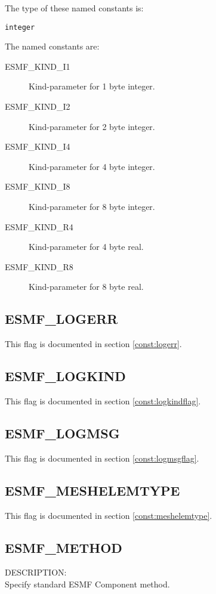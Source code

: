 The type of these named constants is:

{\tt integer}

The named constants are:
\begin{description}
\item [ESMF\_KIND\_I1]
      Kind-parameter for 1 byte integer.
\item [ESMF\_KIND\_I2]
      Kind-parameter for 2 byte integer.
\item [ESMF\_KIND\_I4]
      Kind-parameter for 4 byte integer.
\item [ESMF\_KIND\_I8]
      Kind-parameter for 8 byte integer.
\item [ESMF\_KIND\_R4]
      Kind-parameter for 4 byte real.
\item [ESMF\_KIND\_R8]
      Kind-parameter for 8 byte real.
\end{description}

\subsection{ESMF\_LOGERR}
This flag is documented in section \ref{const:logerr}.

\subsection{ESMF\_LOGKIND}
This flag is documented in section \ref{const:logkindflag}.

\subsection{ESMF\_LOGMSG}
This flag is documented in section \ref{const:logmsgflag}.

\subsection{ESMF\_MESHELEMTYPE}
This flag is documented in section \ref{const:meshelemtype}.

\subsection{ESMF\_METHOD}
\label{const:method}

{\sf DESCRIPTION:\\}  
Specify standard ESMF Component method.

